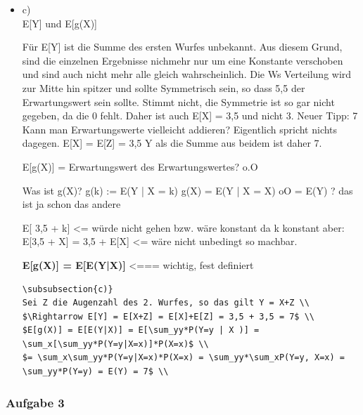 \documentclass[11pt]{article}
\begin{document}
\begin{itemize}
\item c)\\
\label{sec-3-8-3-3}%
E[Y] und E[g(X)]

Für E[Y] ist die Summe des ersten Wurfes unbekannt. Aus diesem Grund, sind die einzelnen Ergebnisse nichmehr
nur um eine Konstante verschoben und sind auch nicht mehr alle gleich wahrscheinlich.
Die Ws Verteilung wird zur Mitte hin spitzer und sollte Symmetrisch sein, so dass 5,5 der Erwartungswert sein sollte.
Stimmt nicht, die Symmetrie ist so gar nicht gegeben, da die 0 fehlt. Daher ist auch E[X] = 3,5 und nicht 3.
Neuer Tipp: 7  Kann man Erwartungswerte vielleicht addieren? Eigentlich spricht nichts dagegen. E[X] = E[Z] = 3,5
Y als die Summe aus beidem ist daher 7.

E[g(X)] = Erwartungswert des Erwartungswertes? o.O

Was ist g(X)? g(k) := E(Y | X = k)
g(X) = E(Y | X = X) oO
= E(Y) ? das ist ja schon das andere

E[ 3,5 + k] <= würde nicht gehen bzw. wäre konstant da k konstant aber:
E[3,5 + X] = 3,5 + E[X]  <= wäre nicht unbedingt so machbar. 

\textbf{E[g(X)] = E[E(Y|X)]}   <=== wichtig, fest definiert


\begin{verbatim}
\subsubsection{c)}
Sei Z die Augenzahl des 2. Wurfes, so das gilt Y = X+Z \\
$\Rightarrow E[Y] = E[X+Z] = E[X]+E[Z] = 3,5 + 3,5 = 7$ \\
$E[g(X)] = E[E(Y|X)] = E[\sum_yy*P(Y=y | X )] = \sum_x[\sum_yy*P(Y=y|X=x)]*P(X=x)$ \\
$= \sum_x\sum_yy*P(Y=y|X=x)*P(X=x) = \sum_yy*\sum_xP(Y=y, X=x) = \sum_yy*P(Y=y) = E(Y) = 7$ \\
\end{verbatim}
   
\end{itemize} %
\subsubsection{Aufgabe 3}
\label{sec-3-8-4}
\end{document}
